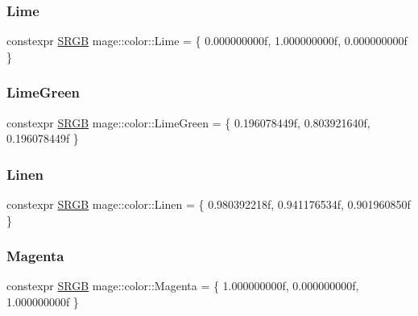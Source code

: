 \hypertarget{namespacemage_1_1color_a1c999e1d7675cba74293d38a38139154}{}\label{namespacemage_1_1color_a1c999e1d7675cba74293d38a38139154} 
\subsubsection{\texorpdfstring{Lime}{Lime}}
{\footnotesize\ttfamily constexpr \hyperlink{structmage_1_1_s_r_g_b}{S\+R\+GB} mage\+::color\+::\+Lime = \{ 0.\+000000000f, 1.\+000000000f, 0.\+000000000f \}}

\hypertarget{namespacemage_1_1color_aad17b85a4829196c44f62040ff8f0b40}{}\label{namespacemage_1_1color_aad17b85a4829196c44f62040ff8f0b40} 
\subsubsection{\texorpdfstring{Lime\+Green}{LimeGreen}}
{\footnotesize\ttfamily constexpr \hyperlink{structmage_1_1_s_r_g_b}{S\+R\+GB} mage\+::color\+::\+Lime\+Green = \{ 0.\+196078449f, 0.\+803921640f, 0.\+196078449f \}}

\hypertarget{namespacemage_1_1color_a3bc3cbcc39faeaafadff758fe12d817d}{}\label{namespacemage_1_1color_a3bc3cbcc39faeaafadff758fe12d817d} 
\subsubsection{\texorpdfstring{Linen}{Linen}}
{\footnotesize\ttfamily constexpr \hyperlink{structmage_1_1_s_r_g_b}{S\+R\+GB} mage\+::color\+::\+Linen = \{ 0.\+980392218f, 0.\+941176534f, 0.\+901960850f \}}

\hypertarget{namespacemage_1_1color_ae6528c5c8fa354b85b2e2a39b7e72d43}{}\label{namespacemage_1_1color_ae6528c5c8fa354b85b2e2a39b7e72d43} 
\subsubsection{\texorpdfstring{Magenta}{Magenta}}
{\footnotesize\ttfamily constexpr \hyperlink{structmage_1_1_s_r_g_b}{S\+R\+GB} mage\+::color\+::\+Magenta = \{ 1.\+000000000f, 0.\+000000000f, 1.\+000000000f \}}

